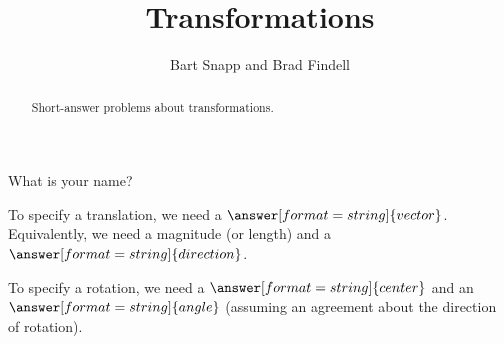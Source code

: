 \documentclass[nooutcomes]{ximera}
\title{Transformations}
\author{Bart Snapp and Brad Findell}
\begin{document}
\begin{abstract}
Short-answer problems about transformations. 
\end{abstract}
\maketitle

\begin{question}
What is your name?
\begin{freeResponse}
\end{freeResponse}
\end{question}




\begin{question}
To specify a translation, we need a $\answer[format=string]{vector}$.  Equivalently, we need a magnitude (or length) and a $\answer[format=string]{direction}$.  
\end{question}

\begin{question}
To specify a rotation, we need a $\answer[format=string]{center}$ and an $\answer[format=string]{angle}$ (assuming an agreement about the direction of rotation).  
\end{question}
\end{document}

